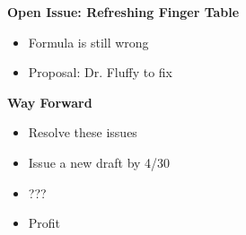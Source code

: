 \documentclass[helvetica]{seminar}
\newcommand{\heading}[1]{%
  \begin{center} 
    \large\bf 
    #1 
  \end{center} 
  \vspace{.4 in}}
\begin{document}
\begin{slide}
\heading{Open Issue: Refreshing Finger Table}

\begin{itemize}
\item Formula is still wrong
\item Proposal: Dr. Fluffy to fix
\end{itemize}



\end{slide}


\begin{slide}
\heading{Way Forward}

\begin{itemize}

\item Resolve these issues
\item Issue a new draft by 4/30
\item ???
\item Profit
\end{itemize}

\end{slide}
\end{document}
